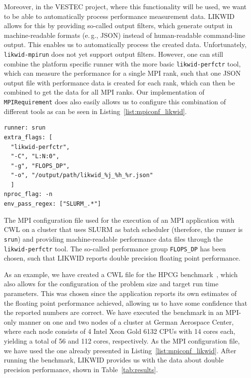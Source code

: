 \documentclass[conference]{IEEEtran}
\newcommand{\cwl}[1]{\texttt{#1}}
\begin{document}
Moreover, in the VESTEC project, where this functionality will be used, we want to be able to automatically process performance measurement data.
LIKWID allows for this by providing so-called output filters, which generate output in machine-readable formats (e.\,g., JSON) instead of human-readable command-line output.
This enables us to automatically process the created data.
Unfortunately, \texttt{likwid-mpirun} does not yet support output filters.
However, one can still combine the platform specific runner with the more basic \texttt{likwid-perfctr} tool, which can measure the performance for a single MPI rank, such that one JSON output file with performance data is created for each rank, which can then be combined to get the data for all MPI ranks.
Our implementation of \cwl{MPIRequirement} does also easily allows us to configure this combination of different tools as can be seen in Listing~\ref{list:mpiconf_likwid}.

\begin{listing}[b]
\begin{verbatim}
runner: srun
extra_flags: [
  "likwid-perfctr", 
  "-C", "L:N:0", 
  "-g", "FLOPS_DP", 
  "-o", "/output/path/likwid_%j_%h_%r.json"
  ]
nproc_flag: -n
env_pass_regex: ["SLURM_.*"]
\end{verbatim}
\caption{The MPI configuration file used for the execution of an MPI application with CWL on a cluster that uses SLURM as batch scheduler (therefore, the runner is \texttt{srun}) and providing machine-readable performance data files through the \texttt{likwid-perfctr} tool. The so-called performance group \texttt{FLOPS\_DP} has been chosen, such that LIKWID reports double precision floating point performance.}
\label{list:mpiconf_likwid}
\end{listing}

As an example, we have created a CWL file for the HPCG benchmark~\cite{HPCG}, which also allows for the configuration of the problem size and target run time parameters. This was chosen since the application reports its own estimates of the floating point performance achieved, allowing us to have some confidence that the reported numbers are correct.
We have executed the benchmark in an MPI-only manner on one and two nodes of a cluster at German Aerospace Center, where each node consists of 4 Intel Xeon Gold 6132 CPUs with 14 cores each, yielding a total of 56 and 112 cores, respectively.
As the MPI configuration file, we have used the one already presented in Listing~\ref{list:mpiconf_likwid}.
After running the benchmark, LIKWID provides us with the data about double precision performance, shown in Table~\ref{tab:results}.
\end{document}
